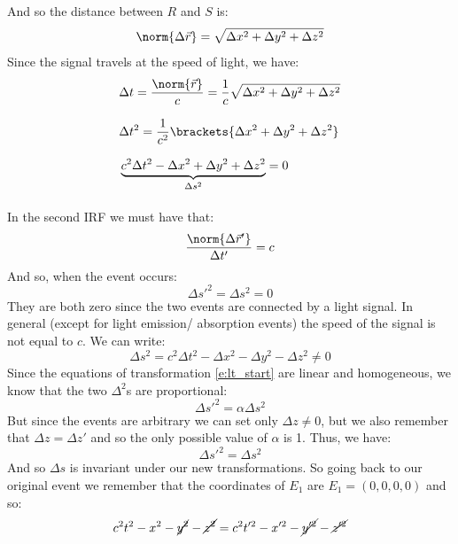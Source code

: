 And so the distance between $R$ and $S$ is:
\begin{equation}
  \norm{\Delta \vec{r}} = \sqrt{\Delta x^2 + \Delta y^2 + \Delta z^2}
\end{equation}
Since the signal travels at the speed of light, we have:
\begin{equation}
  \begin{split}
    &\Delta t = \dfrac{\norm{\vec{r}}}{c} = \dfrac{1}{c}\sqrt{\Delta x^2 + \Delta y^2 + \Delta z^2} \\[8pt]
    &\Delta t^2 = \dfrac{1}{c^2}\brackets{\Delta x^2 + \Delta y^2 + \Delta z^2} \\[8pt]
    &\underbrace{c^2\Delta t^2 - \Delta x^2 + \Delta y^2 + \Delta z^2}_{\Delta s^2} = 0\\[8pt]
  \end{split}
\end{equation}
In the second IRF we must have that:
\begin{equation}
  \dfrac{\norm{\Delta \vec{r}'}}{\Delta t'} = c
\end{equation}
And so, when the event occurs:
\begin{equation}
  \Delta s'^2 = \Delta s^2 = 0
\end{equation}
They are both zero since the two events are connected by a light signal. In general (except for light emission/ absorption events) the speed of the signal is not equal to $c$. We can write:
\begin{equation}
  \Delta s^2 = c^2\Delta t^2 - \Delta x^2 - \Delta y^2 - \Delta z^2 \neq 0
\end{equation}
Since the equations of transformation \eqref{e:lt_start} are linear and homogeneous, we know that the two $\Delta^2$s are proportional:
\begin{equation}
  \Delta s'^2 = \alpha \Delta s^2
\end{equation}
But since the events are arbitrary we can set only $\Delta z \neq 0$, but we also remember that $\Delta z = \Delta z'$ and so the only possible value of $\alpha$ is 1. Thus, we have:
\begin{equation}
  \Delta s'^2 = \Delta s^2
\end{equation}
And so $\Delta s$ is invariant under our new transformations. So going back to our original event we remember that the coordinates of $E_1$ are $E_1 = (0,0,0,0)$ and so:
\begin{equation}
  c^2 t^2 - x^2 - \cancel{ y^2} - \cancel{ z^2} = c^2 t'^2 - x'^2 - \cancel{ y'^2} -\cancel{ z'^2}
\end{equation}
